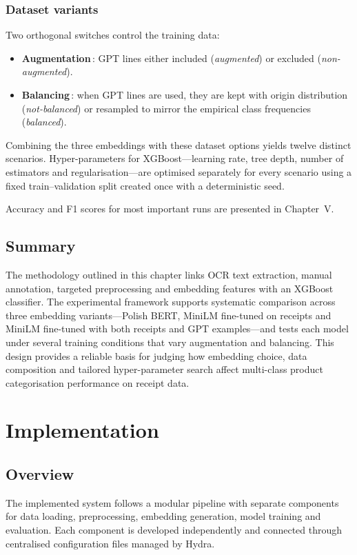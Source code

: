 \documentclass{SGGW-thesis-EN}
\begin{document}
\subsection*{Dataset variants}
Two orthogonal switches control the training data:
\begin{itemize}
  \item \textbf{Augmentation}\,: GPT lines either included (\emph{augmented}) or excluded (\emph{non-augmented}).
  \item \textbf{Balancing}\,: when GPT lines are used, they are kept with origin distribution (\emph{not-balanced}) or resampled to mirror the
        empirical class frequencies (\emph{balanced}).
\end{itemize}

Combining the three embeddings with these dataset options yields twelve distinct scenarios. Hyper-parameters for
XGBoost—learning rate, tree depth, number of estimators and regularisation—are optimised separately for every scenario
using a fixed train–validation split created once with a deterministic seed.

Accuracy and F1 scores for most important runs are presented in Chapter~V.

\section{Summary}
The methodology outlined in this chapter links OCR text extraction, manual annotation, targeted preprocessing and
embedding features with an XGBoost classifier. The experimental framework supports systematic comparison across three
embedding variants—Polish BERT, MiniLM fine-tuned on receipts and MiniLM fine-tuned with both receipts and GPT
examples—and tests each model under several training conditions that vary augmentation and balancing. This design
provides a reliable basis for judging how embedding choice, data composition and tailored hyper-parameter search affect
multi-class product categorisation performance on receipt data.


\chapter{Implementation}

\section{Overview}
The implemented system follows a modular pipeline with separate components for data loading, preprocessing,
embedding generation, model training and evaluation. Each component is developed independently and connected through
centralised configuration files managed by Hydra.
\end{document}
